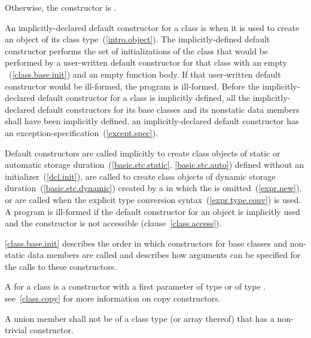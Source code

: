 \pnum
Otherwise, the constructor is
.

\pnum
{}%
An implicitly-declared default constructor for a class is
when it is used
to create an object of its class type~(\ref{intro.object}).
The implicitly-defined default constructor performs the set of
initializations of the class that would be performed by a user-written default
constructor for that class with an empty
~(\ref{class.base.init}) and an empty
function body.
If that user-written default constructor would be ill-formed,
the program is ill-formed.
Before the implicitly-declared default constructor for a class is
implicitly defined,
all the implicitly-declared default constructors for its base classes and
its nonstatic data members shall have been implicitly defined.
\enternote
an implicitly-declared default constructor has an
exception-specification~(\ref{except.spec}).
\exitnote

\pnum
{}%
Default constructors are called implicitly to create class objects of static
or automatic storage duration~(\ref{basic.stc.static}, \ref{basic.stc.auto}) defined
without an initializer~(\ref{dcl.init}),
are called to create class objects of dynamic storage duration~(\ref{basic.stc.dynamic}) created by a
in which the
is omitted~(\ref{expr.new}), or
are called when the explicit type conversion syntax~(\ref{expr.type.conv}) is
used.
A program is ill-formed if the default constructor for an object
is implicitly used and the constructor is not accessible (clause~\ref{class.access}).

\pnum
\enternote
{}%
%
\ref{class.base.init} describes the order in which constructors for base
classes and non-static data members are called and
describes how arguments can be specified for the calls to these constructors.
\exitnote

\pnum
{}%
A  for a class  is a
constructor with a first parameter of type  or of type
 .
\enternote
see~\ref{class.copy} for more information on copy constructors.
\exitnote

\pnum
A union member shall not be of a class type (or array thereof) that has
a non-trivial constructor.

